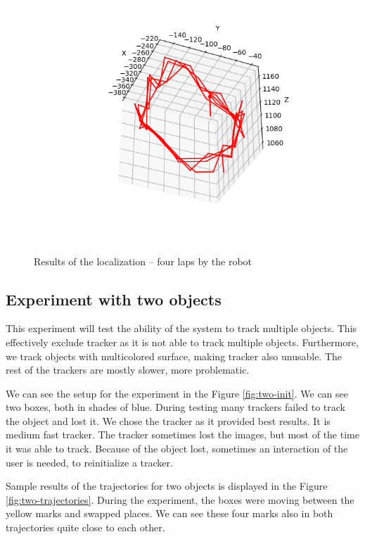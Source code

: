 \begin{figure}
\begin{subfigure}{0.48\linewidth}
	\includegraphics[width=\linewidth]{img/experiments/square-ugly.png}
\end{subfigure}
\caption{Results of the localization -- four laps by the robot}
\label{fig:square-results}
\end{figure}

\subsection{Experiment with two objects}

This experiment will test the ability of the system to track multiple objects.
This effectively exclude \simback{} tracker as it is not able to track multiple
objects. Furthermore, we track objects with multicolored surface, making \hsv
tracker also unusable. The rest of the trackers are mostly slower, more
problematic.

We can see the setup for the experiment in the Figure \ref{fig:two-init}. We
can see two boxes, both in shades of blue. During testing many trackers failed
to track the object and lost it. We chose the \corr{} tracker as it provided
best results. It is medium fast tracker. The tracker sometimes lost the
images, but most of the time it was able to track. Because of the object lost,
sometimes an interaction of the user is needed, to reinitialize a tracker.

Sample results of the trajectories for two objects is displayed in the Figure
\ref{fig:two-trajectories}. During the experiment, the boxes were moving
between the yellow marks and swapped places. We can see these four marks also in
both trajectories quite close to each other. 

